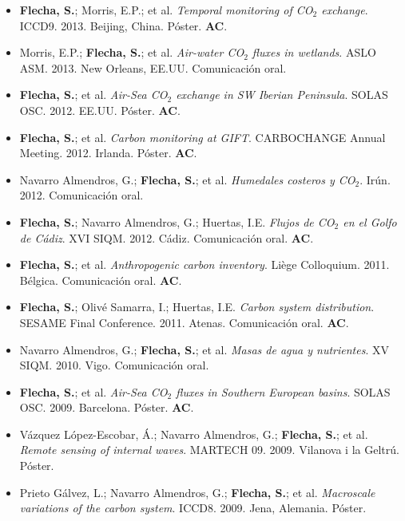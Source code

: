 \documentclass[11pt,a4paper]{article}
\begin{document}
\begin{itemize}[leftmargin=*]
\item[12.] \textbf{Flecha, S.}; Morris, E.P.; et al. 
\textit{Temporal monitoring of CO$_2$ exchange}. 
ICCD9. 2013. Beijing, China. Póster. \textbf{AC}.

\item[11.] Morris, E.P.; \textbf{Flecha, S.}; et al. 
\textit{Air-water CO$_2$ fluxes in wetlands}. 
ASLO ASM. 2013. New Orleans, EE.UU. Comunicación oral.

\item[10.] \textbf{Flecha, S.}; et al. 
\textit{Air-Sea CO$_2$ exchange in SW Iberian Peninsula}. 
SOLAS OSC. 2012. EE.UU. Póster. \textbf{AC}.

\item[9.] \textbf{Flecha, S.}; et al. 
\textit{Carbon monitoring at GIFT}. 
CARBOCHANGE Annual Meeting. 2012. Irlanda. Póster. \textbf{AC}.

\item[8.] Navarro Almendros, G.; \textbf{Flecha, S.}; et al. 
\textit{Humedales costeros y CO$_2$}. 
Irún. 2012. Comunicación oral.

\item[7.] \textbf{Flecha, S.}; Navarro Almendros, G.; Huertas, I.E. 
\textit{Flujos de CO$_2$ en el Golfo de Cádiz}. 
XVI SIQM. 2012. Cádiz. Comunicación oral. \textbf{AC}.

\item[6.] \textbf{Flecha, S.}; et al. 
\textit{Anthropogenic carbon inventory}. 
Liège Colloquium. 2011. Bélgica. Comunicación oral. \textbf{AC}.

\item[5.] \textbf{Flecha, S.}; Olivé Samarra, I.; Huertas, I.E. 
\textit{Carbon system distribution}. 
SESAME Final Conference. 2011. Atenas. Comunicación oral. \textbf{AC}.

\item[4.] Navarro Almendros, G.; \textbf{Flecha, S.}; et al. 
\textit{Masas de agua y nutrientes}. 
XV SIQM. 2010. Vigo. Comunicación oral.

\item[3.] \textbf{Flecha, S.}; et al. 
\textit{Air-Sea CO$_2$ fluxes in Southern European basins}. 
SOLAS OSC. 2009. Barcelona. Póster. \textbf{AC}.

\item[2.] Vázquez López-Escobar, Á.; Navarro Almendros, G.; \textbf{Flecha, S.}; et al. 
\textit{Remote sensing of internal waves}. 
MARTECH 09. 2009. Vilanova i la Geltrú. Póster.

\item[1.] Prieto Gálvez, L.; Navarro Almendros, G.; \textbf{Flecha, S.}; et al. 
\textit{Macroscale variations of the carbon system}. 
ICCD8. 2009. Jena, Alemania. Póster.

\end{itemize}
\end{document}
